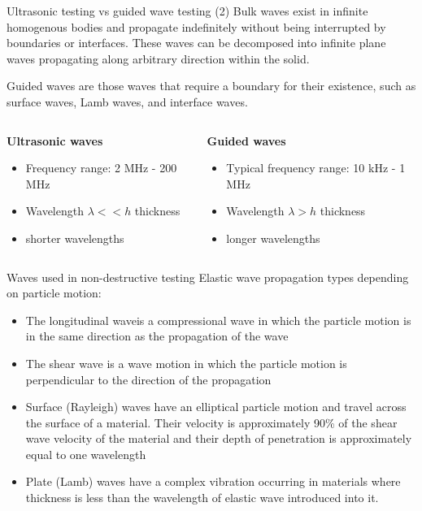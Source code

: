 \documentclass[10pt,aspectratio=169,notes]{beamer} %
\begin{document}
\begin{frame}{Ultrasonic testing vs guided wave testing (2)}
\alert{Bulk waves} exist in infinite homogenous bodies and propagate indefinitely without being interrupted by boundaries or interfaces. 
These waves can be decomposed into infinite plane waves propagating along arbitrary direction within the solid.

\alert{Guided waves} are those waves that require a boundary for their existence, such as surface waves, Lamb waves, and interface waves.
\vspace{5mm}
\begin{columns}[T]
	\begin{column}{0.5\textwidth}
	\textbf{Ultrasonic waves}	
	\begin{itemize}
		\item Frequency range: 2 MHz - 200 MHz
		\item Wavelength \(\lambda << h\) thickness 
		\item shorter wavelengths
	\end{itemize}
	\end{column}
	\begin{column}{0.5\textwidth}
	\textbf{Guided waves}	
	\begin{itemize}
		\item Typical frequency range: 10 kHz - 1 MHz
		\item Wavelength \(\lambda > h\) thickness 
		\item longer wavelengths
	\end{itemize}
	\end{column}
\end{columns}			
\end{frame}
\note{
	
}
\begin{frame}{Waves used in non-destructive testing}
Elastic wave propagation types depending on particle motion:
\begin{itemize}
	\item  \alert{The longitudinal wave}is a compressional wave in which the particle motion is in the same direction as the propagation of the wave
	\item \alert{The shear wave} is a wave motion in which the particle motion is perpendicular to the direction of the propagation
	\item \alert{Surface (Rayleigh) waves} have an elliptical particle motion and travel across the surface of a material. Their velocity is approximately 90\% of the shear wave velocity of the material and their depth of penetration is approximately equal to one
	wavelength
	\item \alert{Plate (Lamb) waves} have a complex vibration occurring in materials where thickness is less than the wavelength of elastic wave introduced into it.
\end{itemize}
		
\end{frame}
\end{document}
